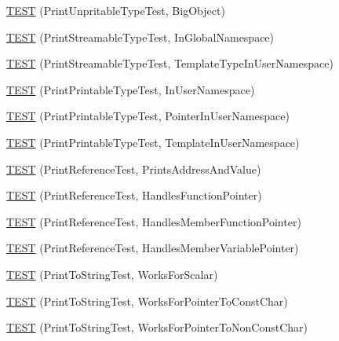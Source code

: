\begin{DoxyCompactItemize}
\hyperlink{namespacetesting_1_1gtest__printers__test_a6b6fba2a191094244f8aa78a4933a2c5}{\-T\-E\-S\-T} (\-Print\-Unpritable\-Type\-Test, \-Big\-Object)
\item 
\hyperlink{namespacetesting_1_1gtest__printers__test_a80fe9d71227a97b12fd5336a823c3d17}{\-T\-E\-S\-T} (\-Print\-Streamable\-Type\-Test, \-In\-Global\-Namespace)
\item 
\hyperlink{namespacetesting_1_1gtest__printers__test_a8ccd96504d676671a0429073d5012ff1}{\-T\-E\-S\-T} (\-Print\-Streamable\-Type\-Test, \-Template\-Type\-In\-User\-Namespace)
\item 
\hyperlink{namespacetesting_1_1gtest__printers__test_a52f5df394111bcc55aecc59ce426088d}{\-T\-E\-S\-T} (\-Print\-Printable\-Type\-Test, \-In\-User\-Namespace)
\item 
\hyperlink{namespacetesting_1_1gtest__printers__test_a3da6191eff6b016540024c2bfccdd90b}{\-T\-E\-S\-T} (\-Print\-Printable\-Type\-Test, \-Pointer\-In\-User\-Namespace)
\item 
\hyperlink{namespacetesting_1_1gtest__printers__test_aa697a3cf25b7f51f26ab49ed8ac3dd31}{\-T\-E\-S\-T} (\-Print\-Printable\-Type\-Test, \-Template\-In\-User\-Namespace)
\item 
\hyperlink{namespacetesting_1_1gtest__printers__test_aeae9b61a9fe582c72580db1466631846}{\-T\-E\-S\-T} (\-Print\-Reference\-Test, \-Prints\-Address\-And\-Value)
\item 
\hyperlink{namespacetesting_1_1gtest__printers__test_aab47074bb60b087e80675a44ad8c88ba}{\-T\-E\-S\-T} (\-Print\-Reference\-Test, \-Handles\-Function\-Pointer)
\item 
\hyperlink{namespacetesting_1_1gtest__printers__test_a88f9089e0b19be4bda74a953d6a47d7b}{\-T\-E\-S\-T} (\-Print\-Reference\-Test, \-Handles\-Member\-Function\-Pointer)
\item 
\hyperlink{namespacetesting_1_1gtest__printers__test_af9c63486049ac0ec2a1db65904702eb3}{\-T\-E\-S\-T} (\-Print\-Reference\-Test, \-Handles\-Member\-Variable\-Pointer)
\item 
\hyperlink{namespacetesting_1_1gtest__printers__test_a5d1bc4b12c18ccaec2ced9f45c092567}{\-T\-E\-S\-T} (\-Print\-To\-String\-Test, \-Works\-For\-Scalar)
\item 
\hyperlink{namespacetesting_1_1gtest__printers__test_a68100148758516ebab9c761ca7778586}{\-T\-E\-S\-T} (\-Print\-To\-String\-Test, \-Works\-For\-Pointer\-To\-Const\-Char)
\item 
\hyperlink{namespacetesting_1_1gtest__printers__test_a1db34d8760c17157572ce2877007d15a}{\-T\-E\-S\-T} (\-Print\-To\-String\-Test, \-Works\-For\-Pointer\-To\-Non\-Const\-Char)

\end{DoxyCompactItemize}
